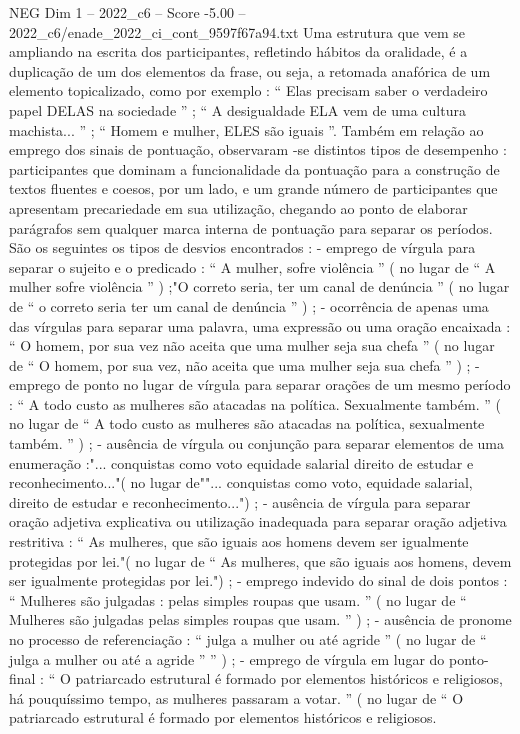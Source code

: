 \begin{textsample}{NEG Dim 1 – 2022\_c6 – Score -5.00 – 2022\_c6/enade\_2022\_ci\_cont\_9597f67a94.txt}
Uma estrutura que vem se ampliando na escrita dos participantes, refletindo hábitos da oralidade, é a duplicação de um dos elementos da frase, ou seja, a retomada anafórica de um elemento topicalizado, como por exemplo : “ Elas precisam saber o verdadeiro papel DELAS na sociedade ” ; “ A desigualdade ELA vem de uma cultura machista... ” ; “ Homem e mulher, ELES são iguais ”.
Também em relação ao emprego dos sinais de pontuação, observaram -se distintos tipos de desempenho : participantes que dominam a funcionalidade da pontuação para a construção de textos fluentes e coesos, por um lado, e um grande número de participantes que apresentam precariedade em sua utilização, chegando ao ponto de elaborar parágrafos sem qualquer marca interna de pontuação para separar os períodos.
São os seguintes os tipos de desvios encontrados : - emprego de vírgula para separar o sujeito e o predicado : “ A mulher, sofre violência ” ( no lugar de “ A mulher sofre violência ” ) ;"O correto seria, ter um canal de denúncia ” ( no lugar de “ o correto seria ter um canal de denúncia ” ) ; - ocorrência de apenas uma das vírgulas para separar uma palavra, uma expressão ou uma oração encaixada : “ O homem, por sua vez não aceita que uma mulher seja sua chefa ” ( no lugar de “ O homem, por sua vez, não aceita que uma mulher seja sua chefa ” ) ; - emprego de ponto no lugar de vírgula para separar orações de um mesmo período : “ A todo custo as mulheres são atacadas na política.
Sexualmente também. ” ( no lugar de “ A todo custo as mulheres são atacadas na política, sexualmente também. ” ) ; - ausência de vírgula ou conjunção para separar elementos de uma enumeração :"... conquistas como voto equidade salarial direito de estudar e reconhecimento..."( no lugar de""... conquistas como voto, equidade salarial, direito de estudar e reconhecimento...") ; - ausência de vírgula para separar oração adjetiva explicativa ou utilização inadequada para separar oração adjetiva restritiva : “ As mulheres, que são iguais aos homens devem ser igualmente protegidas por lei."( no lugar de “ As mulheres, que são iguais aos homens, devem ser igualmente protegidas por lei.") ; - emprego indevido do sinal de dois pontos : “ Mulheres são julgadas : pelas simples roupas que usam. ” ( no lugar de “ Mulheres são julgadas pelas simples roupas que usam. ” ) ; - ausência de pronome no processo de referenciação : “ julga a mulher ou até agride ” ( no lugar de “ julga a mulher ou até a agride ” ” ) ; - emprego de vírgula em lugar do ponto-final : “ O patriarcado estrutural é formado por elementos históricos e religiosos, há pouquíssimo tempo, as mulheres passaram a votar. ” ( no lugar de “ O patriarcado estrutural é formado por elementos históricos e religiosos.

\end{textsample}
